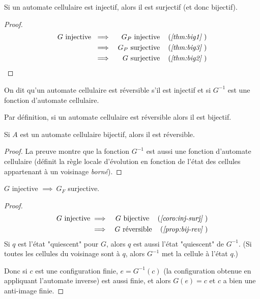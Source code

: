 \begin{coro} \label{coro:inj-surj}
	Si un automate cellulaire est injectif, alors il est surjectif (et donc bijectif).
\end{coro}

\begin{proof}
	\begin{eqnarray*}
		G \text{ injective } &\implies& G_P \text{ injective} \quad\left(\textit{\ref{thm:big1} }\right) \\
		&\implies& G_P \text{ surjective} \quad\left(\textit{\ref{thm:big3} }\right) \\
		&\implies& G \text{ surjective} \quad\left(\textit{\ref{thm:big2} }\right)
	\end{eqnarray*}
\end{proof}


\begin{definition}
	On dit qu'un automate cellulaire est réversible s'il est injectif et si $G^{-1}$ est une fonction d'automate cellulaire.
\end{definition}

\begin{remarque}
	Par définition, si un automate cellulaire est réversible alors il est bijectif.
\end{remarque}

\begin{prop}\label{prop:bij-rev}
	Si $A$ est un automate cellulaire bijectif, alors il est réversible.
\end{prop}

\begin{proof}
	La preuve montre que la fonction $G^{-1}$ est aussi une fonction d'automate cellulaire
	(définit la règle locale d'évolution en fonction de l'état des cellules appartenant à un voisinage \emph{borné}).
\end{proof}

\begin{coro}
	$G$ injective $\implies \ G_F$ surjective.
\end{coro}


\begin{proof}
	\begin{eqnarray*}
		G \text{ injective} &\implies& G \text{ bijective} \quad\left(\textit{\ref{coro:inj-surj} }\right)\\
		&\implies& G \text{ réversible} \quad\left(\textit{\ref{prop:bij-rev} }\right)
	\end{eqnarray*}
	Si $q$ est l'état "quiescent" pour $G$, alors $q$ est aussi l'état "quiescent" de $G^{-1}$.
	(Si toutes les cellules du voisinage sont à $q$, alors $G^{-1}$ met la cellule à l'état $q$.)

	Donc si $c$ est une configuration finie,  $e = G^{-1}(c)$ (la configuration obtenue en appliquant
	l'automate inverse) est aussi finie, et alors $G(e) = c$ et $c$ a bien une anti-image finie.
\end{proof}

